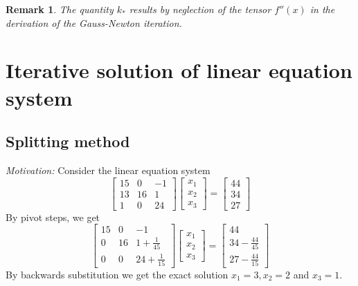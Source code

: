 \documentclass[a4paper]{article}
\numberwithin{lecref}{section}
\theoremstyle{break}
\newtheorem*{Remark}{Remark}
\begin{document}
\begin{Remark}
  The quantity $k_*$ results by neglection of the tensor $f''(x)$ in the derivation of the Gauss-Newton iteration.
\end{Remark}

\section{Iterative solution of linear equation system}
\label{ch:7}
\subsection{Splitting method}
\label{sec:7-1}

\emph{Motivation:} Consider the linear equation system
\[ \begin{bmatrix} 15 & 0 & -1 \\ 13 & 16 & 1 \\ 1 & 0 & 24 \end{bmatrix} \begin{bmatrix} x_1 \\ x_2 \\ x_3 \end{bmatrix} = \begin{bmatrix} 44 \\ 34 \\ 27 \end{bmatrix} \]
By pivot steps, we get
\[ \begin{bmatrix} 15 & 0 & -1 \\ 0 & 16 & 1 + \frac{1}{45} \\ 0 & 0 & 24 + \frac{1}{15} \end{bmatrix} \begin{bmatrix} x_1 \\ x_2 \\ x_3 \end{bmatrix} = \begin{bmatrix} 44 \\ 34 - \frac{44}{45} \\ 27 - \frac{44}{15} \end{bmatrix} \]
By backwards substitution we get the exact solution $x_1 = 3, x_2 = 2$ and $x_3 = 1$.
\end{document}
